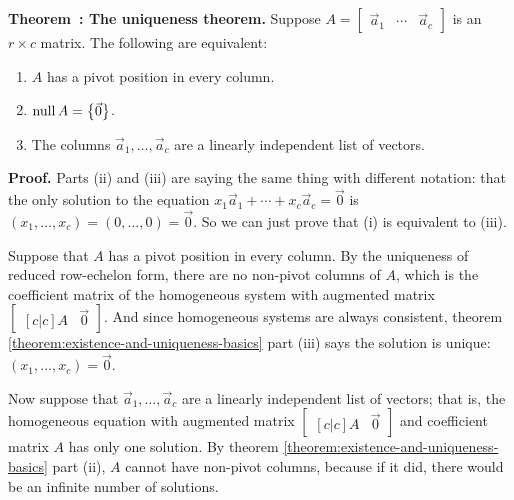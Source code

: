 \documentclass[11pt, letterpaper]{report}
\newenvironment{notes}{}{}
\newenvironment{book}{}{}
\let\originalleft\left
\let\originalright\right
\renewcommand{\left}{\mathopen{}\mathclose\bgroup\originalleft}
\renewcommand{\right}{\aftergroup\egroup\originalright}
\newcounter{theorem}[chapter]
\newenvironment{theorem}[1][]{\refstepcounter{theorem}\begin{bbox}\par
    \noindent\textbf{Theorem~\thetheorem: #1}}{\end{bbox}}
\newlength\oldfboxsep%
\newlength\myminiwidth%
\newenvironment{bbox}{%
  \setlength\oldfboxsep\fboxsep
  \setlength{\fboxsep}{.1in}%
  \setlength\myminiwidth\linewidth%
  \addtolength\myminiwidth{-0.2in}%
  \vspace{0.1in}%
  \begin{lrbox}{\bboxbox}\begin{minipage}{\myminiwidth}%
    }{%
    \end{minipage}\end{lrbox}%
  \noindent\fbox{\usebox{\bboxbox}}\vspace{0.1in}\setlength\fboxsep\oldfboxsep%
}
\DeclareMathOperator{\nul}{null}
\begin{document}
\begin{theorem}[The uniqueness theorem.]
\label{theorem:1.4uniqueness}  
Suppose $A =
\begin{bmatrix}
\vec{a}_1 & \cdots & \vec{a}_c
\end{bmatrix}
$ is an $r \times c$ matrix. The following are equivalent:
\begin{enumerate}[label=(\roman*)]
\item $A$ has a pivot position in every column.
\item $\nul A = \left\{ \vec{0} \right\}$.
\item The columns $\vec{a}_1, \ldots, \vec{a}_c$ are a linearly independent list of vectors.
\end{enumerate}
\end{theorem}

\begin{book}
\textbf{Proof.} Parts (ii) and (iii) are saying the same thing with different notation: that the only solution to the equation $x_1\vec{a}_1+ \cdots + x_c\vec{a}_c = \vec{0}$ is $(x_1,\ldots,x_c) = (0, \ldots, 0) = \vec{0}$. So we can just prove that (i) is equivalent to (iii).

Suppose that $A$ has a pivot position in every column. By the uniqueness of reduced row-echelon form, there are no non-pivot columns of $A$, which is the coefficient matrix of the homogeneous system with augmented matrix $\begin{bmatrix}[c|c]
A & \vec{0}
\end{bmatrix}$. And since homogeneous systems are always consistent, theorem \ref{theorem:existence-and-uniqueness-basics} part (iii) says the solution is unique: $(x_1,\ldots,x_c)=\vec{0}$.

Now suppose that $\vec{a}_1, \ldots, \vec{a}_c$ are a linearly independent list of vectors; that is, the homogeneous equation with augmented matrix $\begin{bmatrix}[c|c]
A & \vec{0}
\end{bmatrix}$ and coefficient matrix $A$ has only one solution. By theorem  \ref{theorem:existence-and-uniqueness-basics} part (ii), $A$ cannot have non-pivot columns, because if it did, there would be an infinite number of solutions. \blacksquare
\end{book}

\begin{notes}
\vfill
\vfill
\newpage
\end{notes}
\end{document}
